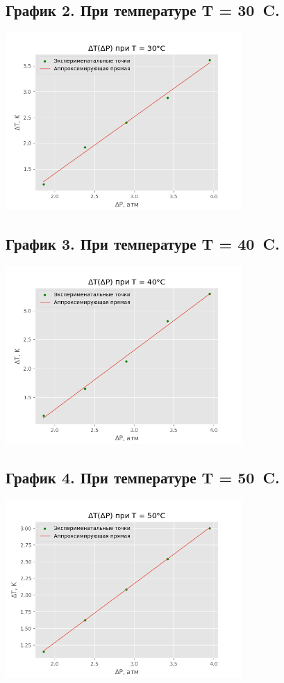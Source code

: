 \documentclass[15pt,a5paper,reqno]{article}
\begin{document}
    \subsection{График 2. При температуре T = 30\ \degree C.}
    \begin{center}
        \includegraphics[width=9cm]{30.png}
    \end{center}
    
    \subsection{График 3. При температуре T = 40\ \degree C.}
    \begin{center}
        \includegraphics[width=9cm]{40.png}
    \end{center}
    
    \subsection{График 4. При температуре T = 50\ \degree C.}
    \begin{center}
        \includegraphics[width=9cm]{50.png}
    \end{center}
    
\end{document}
